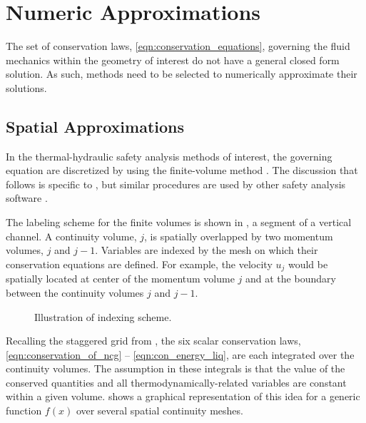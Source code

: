 \section{Numeric Approximations}
\label{sect:numeric_approximation}
The set of conservation laws, \eqref{eqn:conservation_equations}, governing the fluid mechanics within the geometry of interest do not have a general closed form solution.
As such, methods need to be selected to numerically approximate their solutions.

\subsection{Spatial Approximations}
\label{subsect:spatial_approx}
In the thermal-hydraulic safety analysis methods of interest, the governing equation are discretized by using the finite-volume method \cite{LeVeque2002}.
The discussion that follows is specific to \cobra, but similar procedures are used by other safety analysis software \cite{RELAP,TRACE}.

The labeling scheme for the finite volumes is shown in , a segment of a vertical channel.
A continuity volume, $j$, is spatially overlapped by two momentum volumes, $j$ and $j-1$.
Variables are indexed by the mesh on which their conservation equations are defined.
For example, the velocity $u_j$ would be spatially located at center of the momentum volume $j$ and at the boundary between the continuity volumes $j$ and $j-1$.

\begin{figure}[ht]
\begin{center}
\end{center}
\caption{Illustration of indexing scheme.}
\label{fig:vertical_pipe_with_cells}
\end{figure}

Recalling the staggered grid from , the six scalar conservation laws, \eqref{eqn:conservation_of_ncg} -- \eqref{eqn:con_energy_liq}, are each integrated over the continuity volumes.
The assumption in these integrals is that the value of the conserved quantities and all thermodynamically-related variables are constant within a given volume.
 shows a graphical representation of this idea for a generic function $f(x)$ over several spatial continuity meshes.

